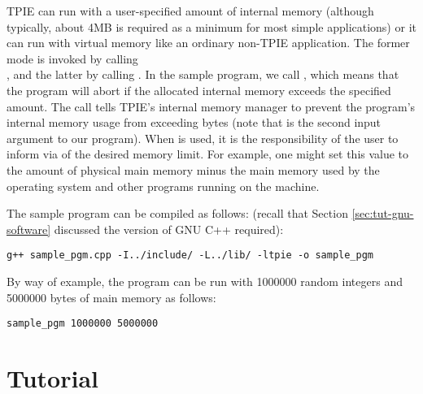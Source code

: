 TPIE can run with a user-specified amount of internal memory
(although typically, about 4MB is required as a minimum for
most simple applications) or it can run with virtual memory
like an ordinary non-TPIE application. The former mode is
invoked by calling \\%
, and the latter
by calling . In
the sample program, we call
, which means
that the program will abort if the allocated internal memory
exceeds the specified amount. The call
 tells
TPIE's internal memory manager  to
prevent the program's internal memory usage from exceeding
 bytes (note that
 is the second input argument to our
program). When 
is used, it is the responsibility of the user to inform
 via  of the
desired memory limit.  For example, one might set this value
to the amount of physical main memory minus the main memory
used by the operating system and other programs running on
the machine.


The sample program can be compiled as follows:
(recall that Section \ref{sec:tut-gnu-software} discussed the version of GNU C++
required):

\begin{verbatim}
g++ sample_pgm.cpp -I../include/ -L../lib/ -ltpie -o sample_pgm
\end{verbatim}

By way of example, the program can be run with 1000000 random integers and 5000000 bytes of main
memory as follows:
\begin{verbatim}
sample_pgm 1000000 5000000
\end{verbatim}


\chapter{Tutorial}

